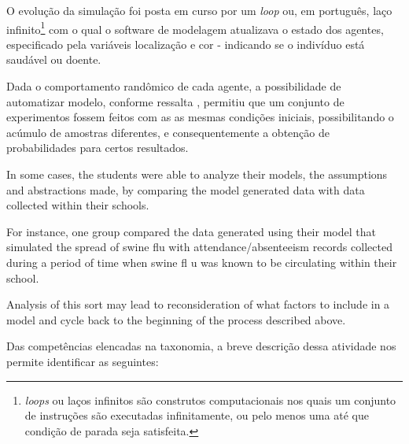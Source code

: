 O evolução da simulação foi posta em curso por um \textit{loop} ou, em português, laço infinito\footnote{\textit{loops} ou laços infinitos são construtos computacionais nos quais um conjunto de instruções são executadas infinitamente, ou pelo menos uma até que condição de parada seja satisfeita.} com o qual o software de modelagem atualizava o estado dos agentes, especificado pela variáveis localização e cor - indicando se o indivíduo está saudável ou doente. 

Dada o comportamento randômico de cada agente, a possibilidade de automatizar modelo, conforme ressalta , permitiu que um conjunto de experimentos fossem feitos com as as mesmas condições iniciais, possibilitando o acúmulo de amostras diferentes, e consequentemente a obtenção de probabilidades para certos resultados. 






In some cases, the students were able to analyze their models, the assumptions and abstractions made, by comparing the model generated data with data collected within their schools.

For instance, one group compared the data generated using their model that simulated the spread of swine flu with attendance/absenteeism records collected during a period of time when swine fl u was known to be circulating within their school.

Analysis of this sort may lead to reconsideration of what factors to include in a model and cycle back to the beginning of the process described above.

Das competências elencadas na taxonomia, a breve descrição dessa atividade nos permite identificar as seguintes:

